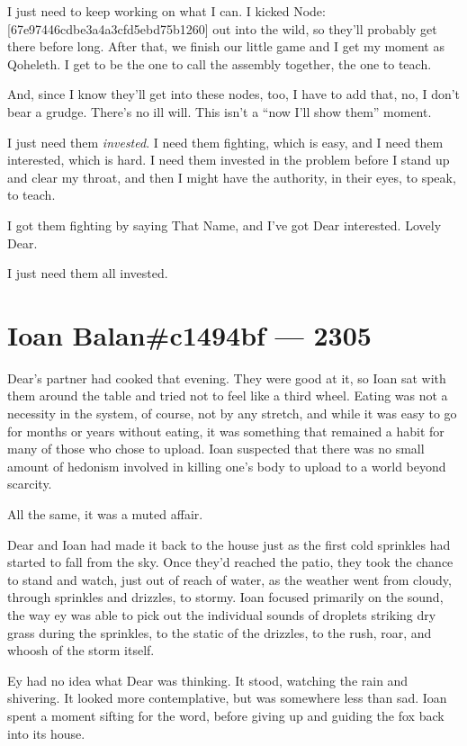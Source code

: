I just need to keep working on what I can. I kicked Node: {[}67e97446cdbe3a4a3cfd5ebd75b1260{]} out into the wild, so they'll probably get there before long. After that, we finish our little game and I get my moment as Qoheleth. I get to be the one to call the assembly together, the one to teach.

And, since I know they'll get into these nodes, too, I have to add that, no, I don't bear a grudge. There's no ill will. This isn't a ``now I'll show them'' moment.

I just need them \emph{invested}. I need them fighting, which is easy, and I need them interested, which is hard. I need them invested in the problem before I stand up and clear my throat, and then I might have the authority, in their eyes, to speak, to teach.

I got them fighting by saying That Name, and I've got Dear interested. Lovely Dear.

I just need them all invested.

\chapter*{Ioan Balan\#c1494bf — 2305}

Dear's partner had cooked that evening. They were good at it, so Ioan sat with them around the table and tried not to feel like a third wheel. Eating was not a necessity in the system, of course, not by any stretch, and while it was easy to go for months or years without eating, it was something that remained a habit for many of those who chose to upload. Ioan suspected that there was no small amount of hedonism involved in killing one's body to upload to a world beyond scarcity.

All the same, it was a muted affair.

Dear and Ioan had made it back to the house just as the first cold sprinkles had started to fall from the sky. Once they'd reached the patio, they took the chance to stand and watch, just out of reach of water, as the weather went from cloudy, through sprinkles and drizzles, to stormy. Ioan focused primarily on the sound, the way ey was able to pick out the individual sounds of droplets striking dry grass during the sprinkles, to the static of the drizzles, to the rush, roar, and whoosh of the storm itself.

Ey had no idea what Dear was thinking. It stood, watching the rain and shivering. It looked more contemplative, but was somewhere less than sad. Ioan spent a moment sifting for the word, before giving up and guiding the fox back into its house.

